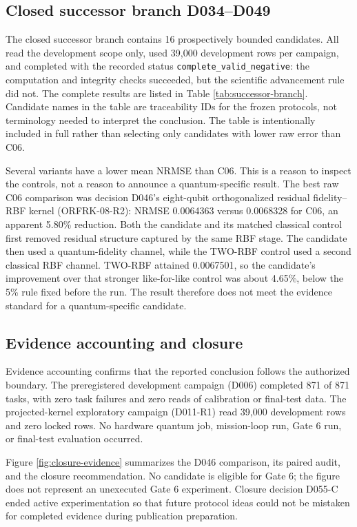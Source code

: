 \subsection{Closed successor branch D034--D049}

The closed successor branch contains 16 prospectively bounded candidates. All
read the development scope only, used 39,000 development rows per campaign,
and completed with the recorded status
\texttt{complete\_valid\_negative}: the computation and integrity checks
succeeded, but the scientific advancement rule did not. The complete results
are listed in Table \ref{tab:successor-branch}. Candidate names in the table are
traceability IDs for the frozen protocols, not terminology needed to interpret
the conclusion. The table is intentionally included in full rather than
selecting only candidates with lower raw error than C06.

Several variants have a lower mean NRMSE than C06. This is a reason to inspect
the controls, not a reason to announce a quantum-specific result. The best raw
C06 comparison was decision D046's eight-qubit orthogonalized residual
fidelity--RBF kernel (ORFRK-08-R2): NRMSE 0.0064363 versus 0.0068328 for C06,
an apparent 5.80\% reduction. Both the candidate and its matched classical
control first removed residual structure captured by the same RBF stage. The
candidate then used a quantum-fidelity channel, while the TWO-RBF control used
a second classical RBF channel. TWO-RBF attained 0.0067501, so the candidate's
improvement over that stronger like-for-like control was about 4.65\%, below
the 5\% rule fixed before the run. The result therefore does not meet the
evidence standard for a quantum-specific candidate.



\subsection{Evidence accounting and closure}

Evidence accounting confirms that the reported conclusion follows the
authorized boundary. The preregistered development campaign (D006) completed
871 of 871 tasks, with zero task failures and zero reads of calibration or
final-test data. The projected-kernel exploratory campaign (D011-R1) read
39,000 development rows and zero locked rows. No hardware quantum job,
mission-loop run, Gate 6 run, or final-test evaluation occurred.

Figure \ref{fig:closure-evidence} summarizes the D046 comparison, its paired
audit, and the closure recommendation. No candidate is eligible for Gate 6;
the figure does not represent an unexecuted Gate 6 experiment. Closure decision
D055-C ended active experimentation so that future protocol ideas could not be
mistaken for completed evidence during publication preparation.

